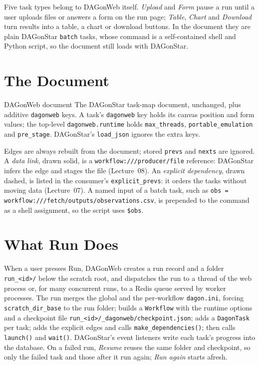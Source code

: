Five task types belong to DAGonWeb itself. \emph{Upload} and \emph{Form} pause
a run until a user uploads files or answers a form on the run page;
\emph{Table}, \emph{Chart} and \emph{Download} turn results into a table, a
chart or download buttons. In the document they are plain DAGonStar
\texttt{batch} tasks, whose command is a self-contained shell and Python
script, so the document still loads with DAGonStar.

\section{The Document}

\begin{definitionbox}{DAGonWeb document}
The DAGonStar task-map document, unchanged, plus additive \texttt{dagonweb}
keys. A task's \texttt{dagonweb} key holds its canvas position and form
values; the top-level \texttt{dagonweb.runtime} holds \texttt{max\_threads},
\texttt{portable\_emulation} and \texttt{pre\_stage}. DAGonStar's
\texttt{load\_json} ignores the extra keys.
\end{definitionbox}

Edges are always rebuilt from the document; stored \texttt{prevs} and
\texttt{nexts} are ignored. A \emph{data link}, drawn solid, is a
\texttt{workflow:///producer/file} reference: DAGonStar infers the edge and
stages the file (Lecture~08). An \emph{explicit dependency}, drawn dashed, is
listed in the consumer's \texttt{explicit\_prevs}: it orders the tasks without
moving data (Lecture~07). A named input of a batch task, such as
\texttt{obs = workflow:///fetch/outputs/observations.csv}, is prepended to the
command as a shell assignment, so the script uses \texttt{\$obs}.

\section{What Run Does}

When a user presses Run, DAGonWeb creates a run record and a folder
\texttt{run\_<id>/} below the scratch root, and dispatches the run to a thread
of the web process or, for many concurrent runs, to a Redis queue served by
worker processes. The run merges the global and the per-workflow
\texttt{dagon.ini}, forcing \texttt{scratch\_dir\_base} to the run folder;
builds a \texttt{Workflow} with the runtime options and a checkpoint file
\texttt{run\_<id>/\_dagonweb/checkpoint.json}; adds a \texttt{DagonTask} per
task; adds the explicit edges and calls \texttt{make\_dependencies()}; then
calls \texttt{launch()} and \texttt{wait()}. DAGonStar's event listeners write
each task's progress into the database. On a failed run, \emph{Resume} reuses
the same folder and checkpoint, so only the failed task and those after it run
again; \emph{Run again} starts afresh.

